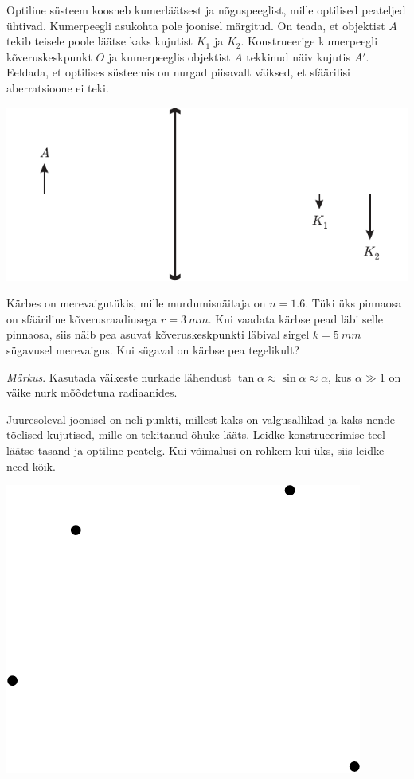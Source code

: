 \documentclass[10pt]{article}
\begin{document}
{
Optiline süsteem koosneb kumerläätsest ja nõguspeeglist, mille optilised peateljed ühtivad. Kumerpeegli asukohta pole joonisel märgitud. On teada, et objektist $A$ tekib teisele poole läätse kaks kujutist $K_1$ ja $K_2$. Konstrueerige kumerpeegli kõveruskeskpunkt $O$ ja kumerpeeglis objektist $A$ tekkinud näiv kujutis $A'$. Eeldada, et optilises süsteemis on nurgad piisavalt väiksed, et sfäärilisi aberratsioone ei teki.

\begin{center}
	\includegraphics[width=\linewidth]{2007-v3g-09-yl}
\end{center}
\probend
\bigskip


Kärbes on merevaigutükis, mille murdumisnäitaja on $n=\num{1,6}$. Tüki üks pinnaosa on sfääriline kõverusraadiusega $r = \SI{3}{mm}$. Kui vaadata kärbse pead läbi selle pinnaosa, siis näib pea asuvat kõveruskeskpunkti läbival sirgel $k = \SI{5}{mm}$ sügavusel merevaigus. Kui sügaval on kärbse pea tegelikult? 

\emph{Märkus}. Kasutada väikeste nurkade lähendust $\tan \alpha \approx \sin \alpha \approx \alpha$, kus $\alpha \gg 1$ on väike nurk mõõdetuna radiaanides.
\probend
\bigskip


Juuresoleval joonisel on neli punkti, millest kaks on valgusallikad ja kaks nende tõelised kujutised, mille on tekitanud õhuke lääts. Leidke konstrueerimise teel läätse tasand ja optiline peatelg. Kui võimalusi on rohkem kui üks, siis leidke need kõik.

\begin{center}
	\includegraphics[width=0.3\linewidth]{2010-v3g-09-punktid}
\end{center}
\probend
\bigskip

}
\end{document}
